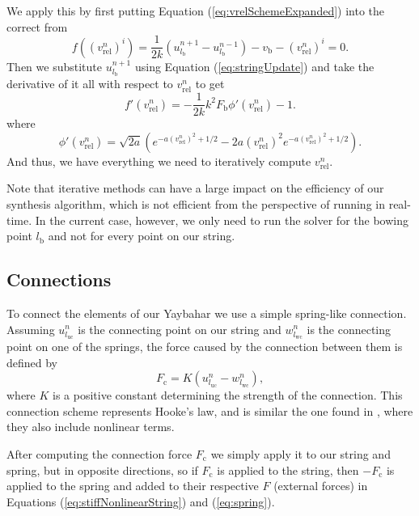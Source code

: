 \documentclass{article}
\begin{document}
We apply this by first putting Equation (\ref{eq:vrelSchemeExpanded}) into the correct from
\begin{equation}
  f((v_\text{rel}^n)^i) = \frac{1}{2k} \left(u^{n+1}_{l_\text{b}} - u^{n-1}_{l_\text{b}} \right) - v_\text{b} - (v_\text{rel}^n)^i = 0.
\end{equation}
Then we substitute $u^{n+1}_{l_\text{b}}$ using Equation (\ref{eq:stringUpdate}) and take the derivative of it all with respect to $v_\text{rel}^n$ to get
\begin{equation}
  f'(v_\text{rel}^n) = - \frac{1}{2k} k^2 F_\text{b} \phi'(v_\text{rel}^n) - 1.
\end{equation}
where
\begin{equation}
  \phi'(v_\text{rel}^n) = \sqrt{2 a} \left(e^{-a (v_\text{rel}^n)^2 + 1/2} - 2 a (v_\text{rel}^n)^2 e^{-a (v_\text{rel}^n)^2 + 1/2} \right).
\end{equation}
And thus, we have everything we need to iteratively compute $v_\text{rel}^n$.

Note that iterative methods can have a large impact on the efficiency of our synthesis algorithm, which is not efficient from the perspective of running in real-time.
In the current case, however,  we only need to run the solver for the bowing point $l_\text{b}$ and not for every point on our string.

\subsection{Connections}
\label{sec:connections}

To connect the elements of our Yaybahar we use a simple spring-like connection.
Assuming $u^n_{l_\text{uc}}$ is the connecting point on our string and $w^n_{l_\text{wc}}$ is the connecting point on one of the springs,
the force caused by the connection between them is defined by
\begin{equation}
  F_\text{c} = K \left(u^n_{l_\text{uc}} - w^n_{l_\text{wc}}\right),
\end{equation}
where $K$ is a positive constant determining the strength of the connection. This connection scheme represents Hooke's law, and is similar the one found in \cite{bilbao_modular_2009}, where they also include nonlinear terms.

After computing the connection force $F_\text{c}$ we simply apply it to our string and spring, but in opposite directions, so if $F_\text{c}$ is applied to the string, then $-F_\text{c}$ is applied to the spring and added to their respective $F$ (external forces) in Equations (\ref{eq:stiffNonlinearString}) and (\ref{eq:spring}).
\end{document}
